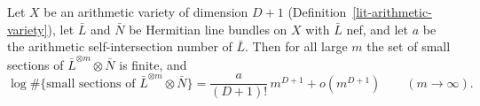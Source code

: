 \begin{theorem}\label{lit-arithmetic-hilbert-samuel}
Let $X$ be an arithmetic variety of dimension $D+1$
(Definition~\ref{lit-arithmetic-variety}), let $\bar L$ and $\bar N$ be
Hermitian line bundles on $X$ with $\bar L$ nef, and let $a$ be the arithmetic
self-intersection number of $\bar L$. Then for all large $m$ the set of small
sections of $\bar L^{\otimes m}\otimes\bar N$ is finite, and
\[
\log\#\{\text{small sections of }\bar L^{\otimes m}\otimes\bar N\}
=\frac{a}{(D+1)!}\,m^{D+1}+o(m^{D+1})\qquad(m\to\infty).
\]
\end{theorem}


